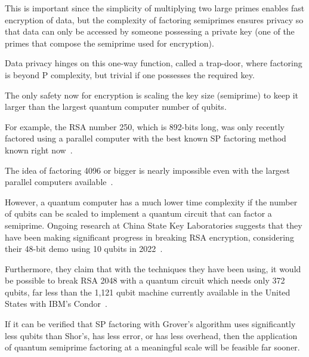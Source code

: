 \documentclass[twocolumn]{cinc}
\begin{document}
  This is important since the simplicity of multiplying two large primes enables fast encryption of data, 
  but the complexity of factoring semiprimes ensures privacy so that data can only be accessed by someone possessing a private key 
  (one of the primes that compose the semiprime used for encryption).

  Data privacy hinges on this one-way function, called a trap-door, where factoring 
  is beyond P complexity, but trivial if one possesses the required key. 

  
  The only safety now for encryption is scaling the key size (semiprime) to keep 
  it larger than the largest quantum computer number of qubits.

  For example, the RSA number 250, which is 892-bits long, was only recently 
  factored using a parallel computer with the best known SP factoring 
  method known right now~\cite{Bai2016}.

  The idea of factoring 4096 or bigger is nearly impossible even with the largest parallel computers available~\cite{FergusonSchneier2003}. 

  However, a quantum computer has a much lower time complexity if the number of qubits
  can be scaled to implement a quantum circuit that can factor a semiprime. Ongoing research
  at China State Key Laboratories suggests that they have been making significant
  progress in breaking RSA encryption, considering their 48-bit demo using 10 qubits
  in 2022~\cite{yan2022factoringintegerssublinearresources}. 
  
  Furthermore, they claim
  that with the techniques they have been using, it would be possible to break
  RSA 2048 with a quantum circuit which needs only 372 qubits, far less than the
  1,121 qubit machine currently available in the United 
  States with IBM's Condor~\cite{abughanem2024ibmquantumcomputersevolution}.


  If it can be verified that SP factoring with Grover's algorithm
  uses significantly less qubits than Shor's, has less error, or has less overhead,
  then the application of quantum semiprime factoring at a meaningful scale 
  will be feasible far sooner.
\end{document}
